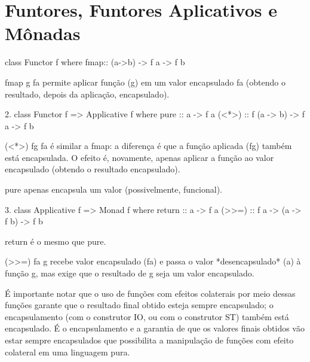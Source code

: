 \chapter{Funtores, Funtores Aplicativos e Mônadas}



     class Functor f where
          fmap:: (a->b) -> f a -> f b

     fmap g fa permite aplicar função (g) em um valor encapsulado fa
     (obtendo o resultado, depois da aplicação, encapsulado).

  2. class Functor f => Applicative f where
       pure  :: a -> f a
       (<*>) :: f (a -> b) -> f a -> f b

      (<*>) fg fa é similar a fmap: a diferença é que a função
      aplicada (fg) também está encapsulada. O efeito é, novamente,
      apenas aplicar a função ao valor encapsulado (obtendo o
      resultado encapsulado).

      pure apenas encapsula um valor (possivelmente, funcional).

   3. class Applicative f => Monad f where
        return :: a -> f a
        (>>=)  :: f a -> (a -> f b) -> f b

      return é o mesmo que pure.

      (>>=) fa g recebe valor encapsulado (fa) e passa o valor
      *desencapsulado* (a) à função g, mas exige que o resultado de g
      seja um valor encapsulado.

É importante notar que o uso de funções com efeitos colaterais por
meio dessas funções garante que o resultado final obtido esteja sempre
encapsulado; o encapsulamento (com o construtor IO, ou com o
construtor ST) também está encapsulado. É o encapsulamento e a
garantia de que os valores finais obtidos vão estar sempre
encapsulados que possibilita a manipulação de funções com efeito
colateral em uma linguagem pura.
